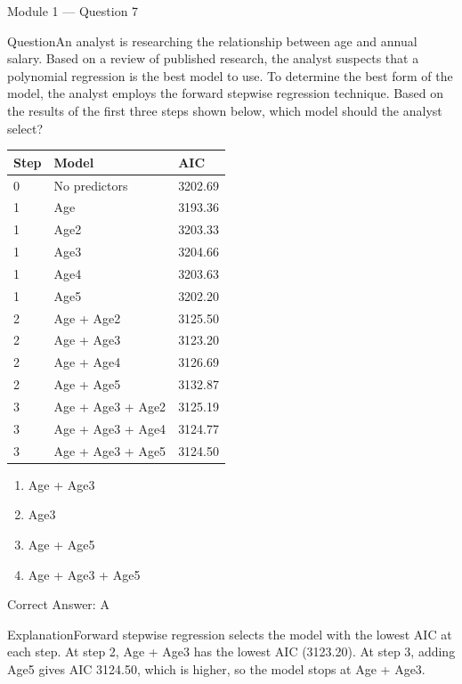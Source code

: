\documentclass[aspectratio=169,10pt]{beamer}
\newcommand{\question}[1]{\begin{block}{Question}#1\end{block}}
\newcommand{\options}[4]{%
	\begin{enumerate}[label=\Alph*.,leftmargin=*]
		\item #1
		\item #2
		\item #3
		\item #4
	\end{enumerate}
}
\newcommand{\answerbox}[1]{\begin{exampleblock}{Correct Answer: #1}\end{exampleblock}}
\newcommand{\explain}[1]{\begin{block}{Explanation}#1\end{block}}
\begin{document}
	\begin{frame}{Module 1 --- Question 7}
		\question{An analyst is researching the relationship between age and annual salary. Based on a review of published research, the analyst suspects that a polynomial regression is the best model to use. To determine the best form of the model, the analyst employs the forward stepwise regression technique. Based on the results of the first three steps shown below, which model should the analyst select?}
		\begin{center}
			\small
			\begin{tabular}{@{}lll@{}}
				\toprule
				Step & Model & AIC \\
				\midrule
				0 & No predictors & 3202.69 \\
				1 & Age & 3193.36 \\
				1 & Age2 & 3203.33 \\
				1 & Age3 & 3204.66 \\
				1 & Age4 & 3203.63 \\
				1 & Age5 & 3202.20 \\
				2 & Age + Age2 & 3125.50 \\
				2 & Age + Age3 & 3123.20 \\
				2 & Age + Age4 & 3126.69 \\
				2 & Age + Age5 & 3132.87 \\
				3 & Age + Age3 + Age2 & 3125.19 \\
				3 & Age + Age3 + Age4 & 3124.77 \\
				3 & Age + Age3 + Age5 & 3124.50 \\
				\bottomrule
			\end{tabular}
		\end{center}
		\options{Age + Age3}{Age3}{Age + Age5}{Age + Age3 + Age5}
		\answerbox{A}
		\explain{Forward stepwise regression selects the model with the lowest AIC at each step. At step 2, Age + Age3 has the lowest AIC (3123.20). At step 3, adding Age5 gives AIC 3124.50, which is higher, so the model stops at Age + Age3.}
	\end{frame}
	
\end{document}

